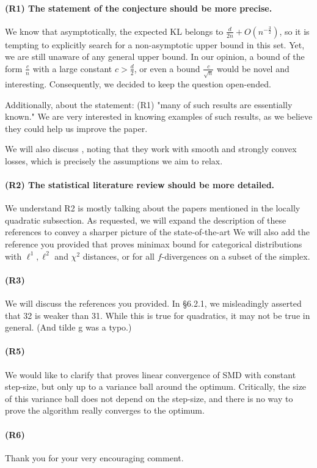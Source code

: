 \paragraph{(R1) The statement of the conjecture should be more precise.}
We know that asymptotically, the expected KL belongs to $\frac{d}{2 n} + O (n^{-\frac{3}{2}})$, so it is tempting to explicitly search for a non-asymptotic upper bound in this set. 
Yet, we are still unaware of any general upper bound.
In our opinion, a bound of the form $\frac{c}{n}$ with a large constant $c>\frac{d}{2}$, or even a bound $\frac{c}{\sqrt{n}}$ would be novel and interesting.
Consequently, we decided to keep the question open-ended.  

Additionally, about the statement: (R1) "many of such results are essentially known."
We are very interested in knowing examples of such   results, as we believe they could help us improve the paper.

We will also discuss \citet{frostig2015competing}, noting that they work with smooth and strongly convex losses, which is precisely the assumptions we aim to relax.

\paragraph{(R2) The statistical literature review should be more detailed.}
We understand R2 is mostly talking about the papers mentioned in the locally quadratic subsection. 
As requested, we will expand the description of these references to convey a sharper picture of the state-of-the-art
We will also add the reference you provided that proves minimax bound for categorical distributions with $\ell^1, \ell^2$ and $\chi^2$ distances, or for all $f$-divergences on a subset of the simplex. 

\paragraph{(R3)} We will discuss the references you provided. In \S6.2.1, we misleadingly asserted that 32 is weaker than 31. While this is true for quadratics, it may not be true in general. (And tilde g was a typo.)

\paragraph{(R5)} We would like to clarify that \citet{dorazio2021stochastic} proves linear convergence of SMD with constant step-size, but only up to a variance ball around the optimum.
Critically, the size of this variance ball does not depend on the step-size, and there is no way to prove the algorithm really converges to the optimum. 

\paragraph{(R6)} 
Thank you for your very encouraging comment.




